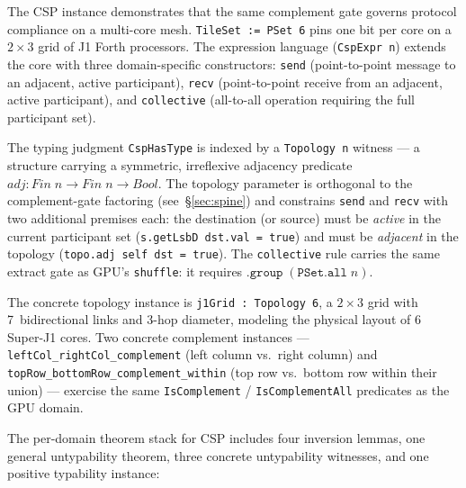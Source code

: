 \documentclass[acmsmall,screen,review,anonymous,nonacm]{acmart}
\newcommand{\IsComplement}{\texttt{IsComplement}}
\newcommand{\IsComplementAll}{\texttt{IsComplementAll}}
\begin{document}
The CSP instance demonstrates that the same complement gate governs protocol compliance on a multi-core mesh. \texttt{TileSet := PSet 6} pins one bit per core on a $2\times3$ grid of J1 Forth processors. The expression language (\texttt{CspExpr n}) extends the core with three domain-specific constructors: \texttt{send} (point-to-point message to an adjacent, active participant), \texttt{recv} (point-to-point receive from an adjacent, active participant), and \texttt{collective} (all-to-all operation requiring the full participant set).

The typing judgment \texttt{CspHasType} is indexed by a \texttt{Topology n} witness --- a structure carrying a symmetric, irreflexive adjacency predicate $\mathit{adj} : \mathit{Fin}\;n \to \mathit{Fin}\;n \to \mathit{Bool}$. The topology parameter is orthogonal to the complement-gate factoring (see~\S\ref{sec:spine}) and constrains \texttt{send} and \texttt{recv} with two additional premises each: the destination (or source) must be \emph{active} in the current participant set (\texttt{s.getLsbD dst.val = true}) and must be \emph{adjacent} in the topology (\texttt{topo.adj self dst = true}). The \texttt{collective} rule carries the same extract gate as GPU's \texttt{shuffle}: it requires $\texttt{.group}\;(\texttt{PSet.all}\;n)$.

The concrete topology instance is \texttt{j1Grid : Topology 6}, a $2\times3$ grid with 7~bidirectional links and 3-hop diameter, modeling the physical layout of 6 Super-J1 cores. Two concrete complement instances --- \texttt{leftCol\_rightCol\_complement} (left column vs.\ right column) and \texttt{topRow\_bottomRow\_complement\_within} (top row vs.\ bottom row within their union) --- exercise the same \IsComplement{} / \IsComplementAll{} predicates as the GPU domain.

The per-domain theorem stack for CSP includes four inversion lemmas, one general untypability theorem, three concrete untypability witnesses, and one positive typability instance:
\end{document}
